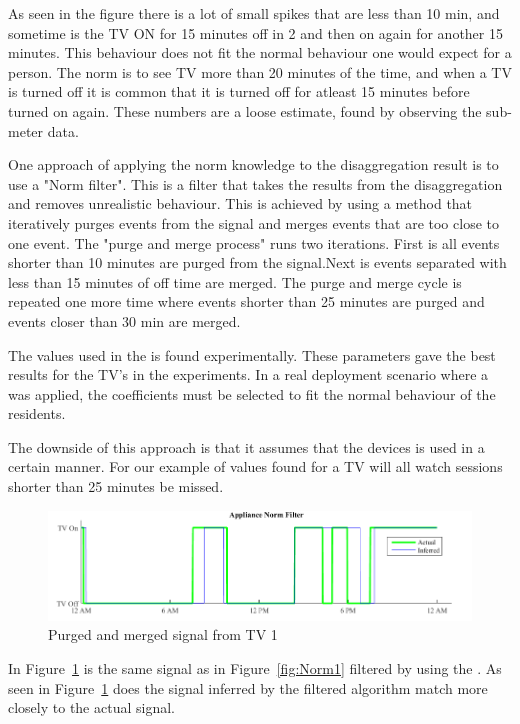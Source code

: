 As seen in the figure there is a lot of small spikes that are less than 10 min, and sometime is the TV ON for 15 minutes off in 2 and then on again for another 15 minutes. This behaviour does not fit the normal behaviour one would expect for a person. The norm is to see TV more than 20 minutes of the time, and when a TV is turned off it is common that it is turned off for atleast 15 minutes before turned on again. These numbers are a loose estimate, found by observing the sub-meter data. 


One approach of applying the norm knowledge to the disaggregation result is to use a "Norm filter". This is a filter that takes the results from the disaggregation and removes unrealistic behaviour. This is achieved by using a method that iteratively purges events from the signal and merges events that are too close to one event. The "purge and merge process" runs two iterations. First is all events shorter than 10 minutes are purged from the signal.Next is events separated with less than 15 minutes of off time are merged. The purge and merge cycle is repeated one more time where events shorter than 25 minutes are purged and events closer than 30 min are merged. 

The values used in the  is found experimentally. These parameters gave the best results for the TV's in the experiments. In a real deployment scenario where a  was applied, the coefficients must be selected to fit the normal behaviour of the residents.

The downside of this approach is that it assumes that the devices is used in a certain manner. For our example of values found for a TV will all watch sessions shorter than 25 minutes be missed.

\begin{figure}[H]
\centering
\includegraphics[width=1\textwidth]{billeder/AppNormFilterH10_2.png}
\caption{Purged and merged signal from TV 1}
\label{fig:Norm2}
\end{figure}

In Figure~\ref{fig:Norm2} is the same signal as in Figure~\ref{fig:Norm1} filtered by using the . As seen in Figure~\ref{fig:Norm2} does the signal inferred by the filtered  algorithm match more closely to the actual signal. 

